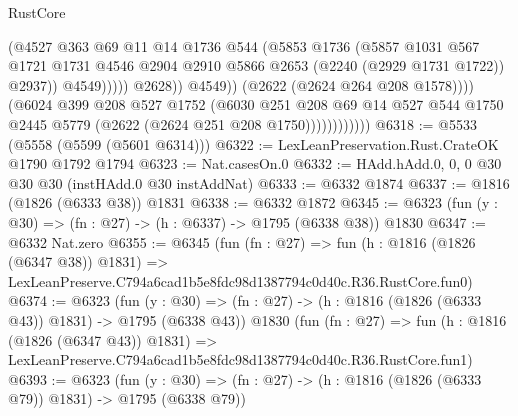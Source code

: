 \begin{lexlean}{RustCore}
\begin{coremodule}
                                        (@4527
                                          @363
                                          @69
                                          @11
                                          @14
                                          @1736
                                          @544
                                          (@5853
                                            @1736
                                            (@5857
                                              @1031
                                              @567
                                              @1721
                                              @1731
                                              @4546
                                              @2904
                                              @2910
                                              @5866
                                              @2653
                                              (@2240 (@2929 @1731 @1722))
                                              @2937))
                                          @4549)))))
                                @2628))
                            @4549))
                        (@2622 (@2624 @264 @208 @1578))))
                    (@6024
                      @399
                      @208
                      @527
                      @1752
                      (@6030
                        @251
                        @208
                        @69
                        @14
                        @527
                        @544
                        @1750
                        @2445
                        @5779
                        (@2622 (@2624 @251 @208 @1750))))))))))))
@6318 := @5533 (@5558 (@5599 (@5601 @6314)))
@6322 := LexLeanPreservation.Rust.CrateOK @1790 @1792 @1794
@6323 := Nat.casesOn.{0}
@6332 := HAdd.hAdd.{0, 0, 0} @30 @30 @30 (instHAdd.{0} @30 instAddNat)
@6333 := @6332 @1874
@6337 := @1816 (@1826 (@6333 @38)) @1831
@6338 := @6332 @1872
@6345 := @6323 (fun (y : @30) => (fn : @27) -> (h : @6337) -> @1795 (@6338 @38)) @1830
@6347 := @6332 Nat.zero
@6355 := @6345
    (fun (fn : @27) =>
    fun (h : @1816 (@1826 (@6347 @38)) @1831) =>
    LexLeanPreserve.C794a6cad1b5e8fdc98d1387794c0d40c.R36.RustCore.fun0)
@6374 := @6323
    (fun (y : @30) => (fn : @27) -> (h : @1816 (@1826 (@6333 @43)) @1831) -> @1795 (@6338 @43))
    @1830
    (fun (fn : @27) =>
    fun (h : @1816 (@1826 (@6347 @43)) @1831) =>
    LexLeanPreserve.C794a6cad1b5e8fdc98d1387794c0d40c.R36.RustCore.fun1)
@6393 := @6323
    (fun (y : @30) => (fn : @27) -> (h : @1816 (@1826 (@6333 @79)) @1831) -> @1795 (@6338 @79))

\end{coremodule}
\end{lexlean}
